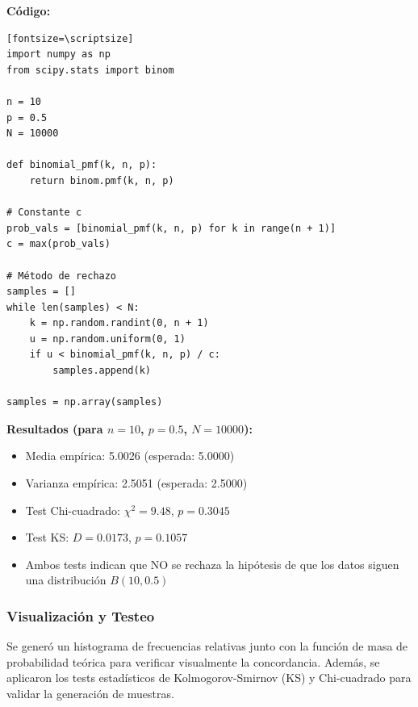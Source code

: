 \documentclass{article}
\begin{document}
\textbf{Código:}
\begin{verbatim}[fontsize=\scriptsize]
import numpy as np
from scipy.stats import binom

n = 10
p = 0.5
N = 10000

def binomial_pmf(k, n, p):
    return binom.pmf(k, n, p)

# Constante c
prob_vals = [binomial_pmf(k, n, p) for k in range(n + 1)]
c = max(prob_vals)

# Método de rechazo
samples = []
while len(samples) < N:
    k = np.random.randint(0, n + 1)
    u = np.random.uniform(0, 1)
    if u < binomial_pmf(k, n, p) / c:
        samples.append(k)

samples = np.array(samples)
\end{verbatim}

\textbf{Resultados (para $n=10$, $p=0.5$, $N=10000$):}
\begin{itemize}
    \item Media empírica: 5.0026 \hfill (esperada: 5.0000)
    \item Varianza empírica: 2.5051 \hfill (esperada: 2.5000)
    \item Test Chi-cuadrado: $\chi^2 = 9.48$, $p = 0.3045$
    \item Test KS: $D = 0.0173$, $p = 0.1057$
    \item Ambos tests indican que NO se rechaza la hipótesis de que los datos siguen una distribución $B(10, 0.5)$
\end{itemize}

\vspace{0.5em}
\subsubsection{Visualización y Testeo}
Se generó un histograma de frecuencias relativas junto con la función de masa de probabilidad teórica para verificar visualmente la concordancia. Además, se aplicaron los tests estadísticos de Kolmogorov-Smirnov (KS) y Chi-cuadrado para validar la generación de muestras.
\end{document}
